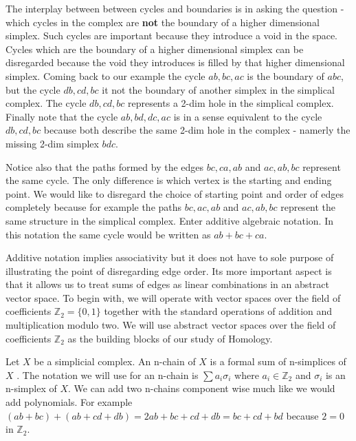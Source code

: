 The interplay between between cycles and boundaries is in asking the question - which cycles in the complex are \textbf{not} the boundary of a higher dimensional simplex. Such cycles are important because they introduce a void in the space. Cycles which are the boundary of a higher dimensional simplex can be disregarded because the void they introduces is filled by that higher dimensional simplex. Coming back to our example the cycle $ab, bc, ac$ is the boundary of $abc$, but the cycle $db, cd, bc$ it not the boundary of another simplex in the simplical complex. The cycle $db, cd, bc$ represents a 2-dim hole in the simplical complex. Finally note that the cycle $ab, bd, dc, ac$ is in a sense equivalent to the cycle $db, cd, bc$ because both describe the same 2-dim hole in the complex - namerly the missing 2-dim simplex $bdc$.


Notice also that the paths formed by the edges $bc, ca, ab$ and $ac, ab, bc$ represent the same cycle. The only difference is which vertex is the starting and ending point. We would like to disregard the choice of starting point and order of edges completely because for example the paths $bc, ac, ab$ and $ac, ab, bc$  represent the same structure in the simplical complex. Enter additive algebraic notation. In this notation the same cycle would be written as $ab + bc + ca$.

Additive notation implies associativity but it does not have to sole purpose of illustrating the point of disregarding edge order. Its more important aspect is that it allows us to treat sums of edges as linear combinations in an abstract vector space. To begin with, we will operate with vector spaces over the field of coefficients $\mathbb{Z}_2 = \{0, 1\}$ together with the standard operations of addition and multiplication modulo two. We will use abstract vector spaces over the field of coefficients $\mathbb{Z}_2$ as the building blocks of our study of Homology.

Let $X$ be a simplicial complex. An n-chain of $X$ is a formal sum of n-simplices of $X$ \cite{comp-topo}. The notation we will use for an n-chain is $\sum{a_i \sigma_i}$ where $a_i \in \mathbb{Z}_2$ and $\sigma_i$ is an n-simplex of $X$. We can add two n-chains component wise much like we would add polynomials. For example $(ab + bc) + (ab + cd + db) = 2ab + bc + cd + db = bc + cd + bd$ because $2 = 0$ in $\mathbb{Z}_2$.

